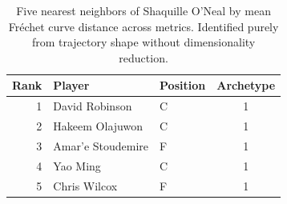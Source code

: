 \begin{table}[htbp]
  \centering\small
  \begin{tabular}{rllc}
    \toprule
    Rank & Player & Position & Archetype \\
    \midrule
    1 & David Robinson & C & 1 \\
    2 & Hakeem Olajuwon & C & 1 \\
    3 & Amar'e Stoudemire & F & 1 \\
    4 & Yao Ming & C & 1 \\
    5 & Chris Wilcox & F & 1 \\
    \bottomrule
  \end{tabular}
  \caption{Five nearest neighbors of Shaquille O'Neal by mean Fr\'{e}chet curve distance across metrics. Identified purely from trajectory shape without dimensionality reduction.}
  \label{tab:Shaquille_O_Neal_frechet_curve_neighbors}
\end{table}

